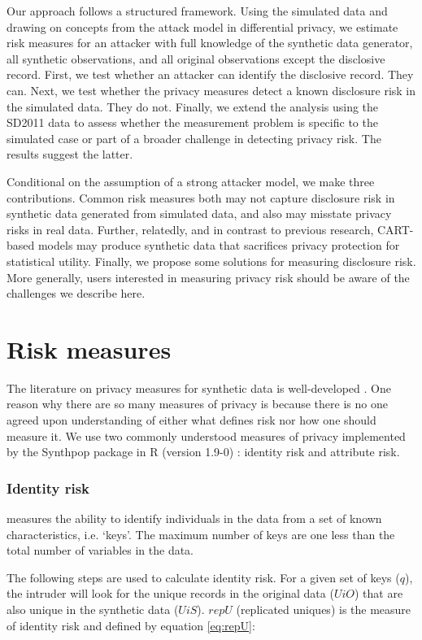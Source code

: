 \documentclass[a4paper,11pt]{style/uneceart}
\begin{document}
Our approach follows a structured framework. Using the simulated data and drawing on concepts from the attack model in differential privacy, we estimate risk measures for an attacker with full knowledge of the synthetic data generator, all synthetic observations, and all original observations except the disclosive record.  First, we test whether an attacker can identify the disclosive record.  They can.  Next, we test whether the privacy measures detect a known disclosure risk in the simulated data. They do not.  Finally, we extend the analysis using the SD2011 data to assess whether the measurement problem is specific to the simulated case or part of a broader challenge in detecting privacy risk. The results suggest the latter.

Conditional on the assumption of a strong attacker model, we make three contributions.  Common risk measures both may not capture disclosure risk in synthetic data generated from simulated data, and also may misstate privacy risks in real data.  Further, relatedly, and in contrast to previous research, CART-based models may produce synthetic data that sacrifices privacy protection for statistical utility.  Finally, we propose some solutions for measuring disclosure risk.  More generally, users interested in measuring privacy risk should be aware of the challenges we describe here.

\section{Risk measures}

The literature on privacy measures for synthetic data is well-developed \cite{wagner2018technical}.  One reason why there are so many measures of privacy is because there is no one agreed upon understanding of either what defines risk nor how one should measure it.  We use two commonly understood measures of privacy implemented by the Synthpop package in R (version 1.9-0) \cite{raab2025practicalprivacymetricssynthetic}: identity risk and attribute risk.  

\subsubsection{Identity risk} measures the ability to identify individuals in the data from a set of known characteristics, i.e. `keys'. The maximum number of keys are one less than the total number of variables in the data.  

The following steps are used to calculate identity risk.  For a given set of keys ($q$), the intruder will look for the unique records in the original data ($UiO$) that are also unique in the synthetic data ($UiS$).  $repU$ (replicated uniques) is the measure of identity risk and defined by equation \ref{eq:repU}:
\end{document}

